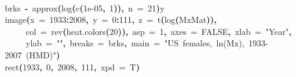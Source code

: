 \documentclass[a4paper]{article}
\newcommand{\hlnumber}[1]{\textcolor[rgb]{0.0823529411764706,0.0784313725490196,0.709803921568627}{#1}}%
\newcommand{\hlfunctioncall}[1]{\textcolor[rgb]{1,0,0}{#1}}%
\newcommand{\hlstring}[1]{\textcolor[rgb]{0.6,0.6,1}{#1}}%
\newcommand{\hlkeyword}[1]{\textcolor[rgb]{0,0,0}{\textbf{#1}}}%
\newcommand{\hlargument}[1]{\textcolor[rgb]{0.694117647058824,0.247058823529412,0.0196078431372549}{#1}}%
\newcommand{\hlassignement}[1]{\textcolor[rgb]{0.215686274509804,0.215686274509804,0.384313725490196}{\textbf{#1}}}%
\newcommand{\hlsymbol}[1]{\textcolor[rgb]{0,0,0}{#1}}%
\newcommand{\hlprompt}[1]{\textcolor[rgb]{0,0,0}{#1}}%
\newcommand{\hlstd}[1]{\textcolor[rgb]{0,0,0}{#1}}%
\newenvironment{Houtput}{\raggedright}{%
%
}
\begin{document}
\begin{Houtput}
\hspace*{\fill}\\
\hlstd{}\ttfamily\noindent
\hlprompt{\usebox{\hlnormalsizeboxgreaterthan}{\ }}\hlsymbol{brks}{\ }\hlassignement{\usebox{\hlnormalsizeboxlessthan}-}{\ }\hlfunctioncall{approx}\hlkeyword{(}\hlfunctioncall{log}\hlkeyword{(}\hlfunctioncall{c}\hlkeyword{(}\hlnumber{1e-05}\hlkeyword{,}{\ }\hlnumber{1}\hlkeyword{)}\hlkeyword{)}\hlkeyword{,}{\ }\hlargument{n}{\ }\hlargument{=}{\ }\hlnumber{21}\hlkeyword{)}\hlkeyword{\usebox{\hlnormalsizeboxdollar}}\hlsymbol{y}\mbox{}
\normalfont
\hspace*{\fill}\\
\hlstd{}\ttfamily\noindent
\hlprompt{\usebox{\hlnormalsizeboxgreaterthan}{\ }}\hlfunctioncall{image}\hlkeyword{(}\hlargument{x}{\ }\hlargument{=}{\ }\hlnumber{1933}\hlkeyword{:}\hlnumber{2008}\hlkeyword{,}{\ }\hlargument{y}{\ }\hlargument{=}{\ }\hlnumber{0}\hlkeyword{:}\hlnumber{111}\hlkeyword{,}{\ }\hlargument{z}{\ }\hlargument{=}{\ }\hlfunctioncall{t}\hlkeyword{(}\hlfunctioncall{log}\hlkeyword{(}\hlsymbol{MxMat}\hlkeyword{)}\hlkeyword{)}\hlkeyword{,}\hspace*{\fill}\\
\hlstd{}\hlprompt{{\ }}{\ }{\ }{\ }{\ }\hlargument{col}{\ }\hlargument{=}{\ }\hlfunctioncall{rev}\hlkeyword{(}\hlfunctioncall{heat.colors}\hlkeyword{(}\hlnumber{20}\hlkeyword{)}\hlkeyword{)}\hlkeyword{,}{\ }\hlargument{asp}{\ }\hlargument{=}{\ }\hlnumber{1}\hlkeyword{,}{\ }\hlargument{axes}{\ }\hlargument{=}{\ }\hlnumber{FALSE}\hlkeyword{,}{\ }\hlargument{xlab}{\ }\hlargument{=}{\ }\hlstring{"Year"}\hlkeyword{,}\hspace*{\fill}\\
\hlstd{}\hlprompt{{\ }}{\ }{\ }{\ }{\ }\hlargument{ylab}{\ }\hlargument{=}{\ }\hlstring{""}\hlkeyword{,}{\ }\hlargument{breaks}{\ }\hlargument{=}{\ }\hlsymbol{brks}\hlkeyword{,}{\ }\hlargument{main}{\ }\hlargument{=}{\ }\hlstring{"US{\ }females,{\ }ln(Mx),{\ }1933-2007{\ }(HMD)"}\hlkeyword{)}\mbox{}
\normalfont
\hspace*{\fill}\\
\hlstd{}\ttfamily\noindent
\hlprompt{\usebox{\hlnormalsizeboxgreaterthan}{\ }}\hlfunctioncall{rect}\hlkeyword{(}\hlnumber{1933}\hlkeyword{,}{\ }\hlnumber{0}\hlkeyword{,}{\ }\hlnumber{2008}\hlkeyword{,}{\ }\hlnumber{111}\hlkeyword{,}{\ }\hlargument{xpd}{\ }\hlargument{=}{\ }\hlsymbol{T}\hlkeyword{)}\mbox{}
\normalfont
\hspace*{\fill}\\

\end{Houtput}
\end{document}
